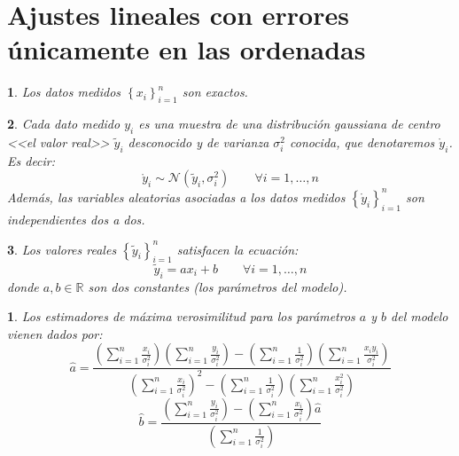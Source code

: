 \documentclass[11pt,a4paper,spanish]{article}
\numberwithin{equation}{section}
\numberwithin{table}{section}
\numberwithin{figure}{section}
\theoremstyle{definition}
\theoremstyle{remark}
\theoremstyle{definition}
\theoremstyle{remark}
\theoremstyle{plain}
\newtheorem{prop}{\protect\propositionname}[section]
\theoremstyle{plain}
\theoremstyle{plain}
\theoremstyle{plain}
\theoremstyle{plain}
\newtheorem{assumption}{\protect\assumptionname}[section]
\theoremstyle{plain}
\providecommand{\assumptionname}{Suposición}
\providecommand{\propositionname}{Proposición}
\begin{document}
	
	\section{Ajustes lineales con errores únicamente en las ordenadas}\label{subsec:LEO}
	\begin{assumption}
		\label{assu:LEO xi exactos}Los datos medidos $\left\{ x_{i}\right\} _{i=1}^{n}$
		son exactos.
	\end{assumption}
	\begin{assumption}
		\label{assu:LEO yi}Cada dato medido $y_{i}$ es una muestra de una
		distribución gaussiana de centro <<el valor real>> $\tilde{y}_{i}$
		desconocido y de varianza $\sigma_{i}^{2}$ conocida, que denotaremos
		$\mathring{y}_{i}$. Es decir:
		\[
		\mathring{y}_{i}\sim\mathcal{N}\left(\tilde{y}_{i},\sigma_{i}^{2}\right)\qquad\forall i=1,\dots,n
		\]
		Además, las variables aleatorias asociadas a los datos medidos $\left\{ \mathring{y}_{i}\right\} _{i=1}^{n}$
		son independientes dos a dos.
	\end{assumption}
	\begin{assumption}
		\label{assu:LEO yi tilde}Los valores reales $\left\{ \tilde{y}_{i}\right\} _{i=1}^{n}$
		satisfacen la ecuación:
		\[
		\tilde{y}_{i}=ax_{i}+b\qquad\forall i=1,\dots,n
		\]
		donde $a,b\in\mathbb{R}$ son dos constantes (los parámetros del modelo).
	\end{assumption}
	\begin{prop}
		\label{prop:LEO m=0000E1xima verosimliitud}Los estimadores de máxima
		verosimilitud para los parámetros $a$ y $b$ del modelo vienen dados
		por:
		\[
		\hat{a}=\frac{{\displaystyle \left(\sum_{i=1}^{n}\frac{x_{i}}{\sigma_{i}^{2}}\right)\left(\sum_{i=1}^{n}\frac{y_{i}}{\sigma_{i}^{2}}\right)-\left(\sum_{i=1}^{n}\frac{1}{\sigma_{i}^{2}}\right)\left(\sum_{i=1}^{n}\frac{x_{i}y_{i}}{\sigma_{i}^{2}}\right)}}{{\displaystyle \left(\sum_{i=1}^{n}\frac{x_{i}}{\sigma_{i}^{2}}\right)^{2}-\left(\sum_{i=1}^{n}\frac{1}{\sigma_{i}^{2}}\right)\left(\sum_{i=1}^{n}\frac{x_{i}^{2}}{\sigma_{i}^{2}}\right)}}
		\]
		\[
		\hat{b}=\frac{{\displaystyle \left(\sum_{i=1}^{n}\frac{y_{i}}{\sigma_{i}^{2}}\right)-\left(\sum_{i=1}^{n}\frac{x_{i}}{\sigma_{i}^{2}}\right)\hat{a}}}{{\displaystyle \left(\sum_{i=1}^{n}\frac{1}{\sigma_{i}^{2}}\right)}}
		\]
	\end{prop}
\end{document}
